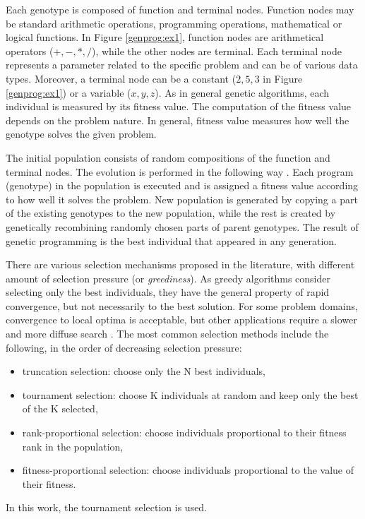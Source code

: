 Each genotype is composed of function and terminal nodes.
Function nodes may be standard arithmetic operations, programming operations, mathematical or logical functions.
In Figure \ref{genprog:ex1}, function nodes are arithmetical operators ($+, -, *, /$), while the other nodes are terminal.
Each terminal node represents a parameter related to the specific problem and can be of various data types.
Moreover, a terminal node can be a constant ($2, 5, 3$ in Figure \ref{genprog:ex1}) or a variable ($x, y, z$).
As in general genetic algorithms, each individual is measured by its fitness value.
The computation of the fitness value depends on the problem nature.
In general, fitness value measures how well the genotype solves the given problem.

The initial population consists of random compositions of the function and terminal nodes.
The evolution is performed in the following way \cite{koza1992genetic}.
Each program (genotype) in the population is executed and is assigned a fitness value according to how well it solves the problem.
New population is generated by copying a part of the existing genotypes to the new population, while the rest is created by genetically recombining randomly chosen parts of parent genotypes.
The result of genetic programming is the best individual that appeared in any generation.

There are various selection mechanisms proposed in the literature, with different amount of selection pressure (or \textit{greediness}).
As greedy algorithms consider selecting only the best individuals, they have the general property of rapid convergence, but not necessarily to the best solution.
For some problem domains, convergence to local optima is acceptable, but other applications require a slower and more diffuse search \cite{rozenberg2012handbook}.
The most common selection methods include the following, in the order of decreasing selection pressure:
\begin{itemize}
	\item truncation selection: choose only the N best individuals,
	\item tournament selection: choose K individuals at random and keep only the best of the K selected,
	\item rank-proportional selection: choose individuals proportional to their fitness rank in the population,
	\item fitness-proportional selection: choose individuals proportional to the value of their fitness.
\end{itemize}
In this work, the tournament selection is used.

